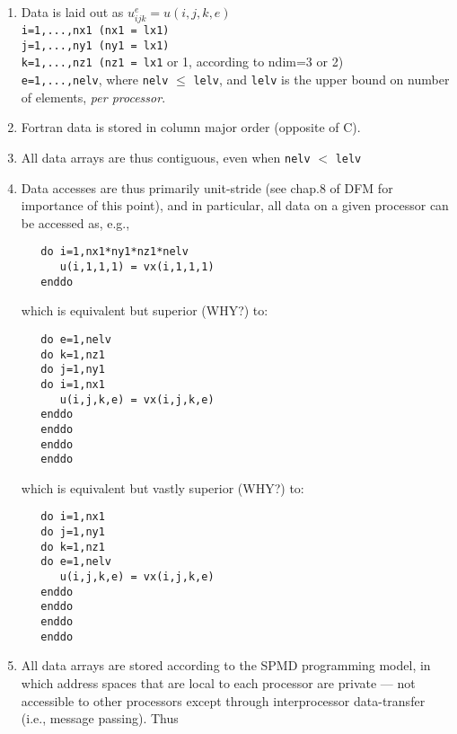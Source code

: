 \begin{enumerate}
\item
Data is laid out as  $u_{ijk}^e = u(i,j,k,e)$ \\

{\tt   i=1,...,nx1   (nx1 = lx1)} \\
{\tt   j=1,...,ny1   (ny1 = lx1)} \\
{\tt   k=1,...,nz1   (nz1 = lx1} or 1, according to ndim=3 or 2) \\

{\tt   e=1,...,nelv}, where {\tt nelv} $\le$ {\tt lelv}, and {\tt lelv} is the upper
                 bound on number of elements, {\em per processor}.


\item
 Fortran data is stored in column major order (opposite of C).

\item
 All data arrays are thus contiguous, even when {\tt nelv} $<$ {\tt lelv}

\item Data accesses are thus primarily unit-stride (see chap.8 of DFM
   for importance of this point), and in particular, all data on
   a given processor can be accessed as, e.g.,


\begin{verbatim}
   do i=1,nx1*ny1*nz1*nelv
      u(i,1,1,1) = vx(i,1,1,1)
   enddo
\end{verbatim}

   which is equivalent but superior (WHY?) to:

\begin{verbatim}
   do e=1,nelv
   do k=1,nz1
   do j=1,ny1
   do i=1,nx1
      u(i,j,k,e) = vx(i,j,k,e)
   enddo
   enddo
   enddo
   enddo
\end{verbatim}


   which is equivalent but vastly superior (WHY?) to:

\begin{verbatim}
   do i=1,nx1
   do j=1,ny1
   do k=1,nz1
   do e=1,nelv
      u(i,j,k,e) = vx(i,j,k,e)
   enddo
   enddo
   enddo
   enddo
\end{verbatim}


\item All data arrays are stored according to the SPMD programming
   model, in which address spaces that are local to each processor
   are private --- not accessible to other processors except through
   interprocessor data-transfer (i.e., message passing).  Thus


\end{enumerate}
